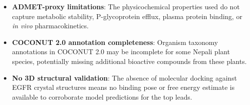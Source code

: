 \begin{itemize}
          from hundreds of laboratories with different protocols, imposing a label
          noise ceiling on scaffold-split test-set performance.
    \item \textbf{ADMET-proxy limitations}: The physicochemical properties used
          do not capture metabolic stability, P-glycoprotein efflux, plasma protein
          binding, or \textit{in vivo} pharmacokinetics.
    \item \textbf{COCONUT 2.0 annotation completeness}: Organism taxonomy annotations
          in COCONUT 2.0 may be incomplete for some Nepali plant species, potentially
          missing additional bioactive compounds from these plants.
    \item \textbf{No 3D structural validation}: The absence of molecular docking
          against EGFR crystal structures means no binding pose or free energy
          estimate is available to corroborate model predictions for the top leads.
\end{itemize}